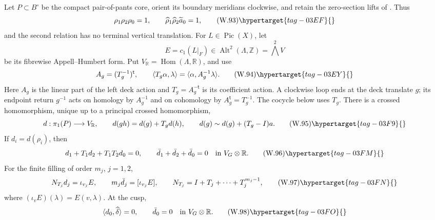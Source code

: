 \begin{proposition}
\hypertarget{tag-03IH}{}\label{wbII:prop:analytic-ah-boundary}

Let \(P\subset B^\circ\) be the compact pair-of-pants core,
orient its boundary meridians clockwise, and retain the zero-section lifts
of .  Thus
\[
 \rho_1\rho_2\rho_0=1,
 \qquad
 \widehat\rho_1\widehat\rho_2\widetilde a_0=1,
\tag{W.93}\hypertarget{tag-03EF}{}\label{wbII:eq:W:5.17-A1}
\]
and the second relation has no terminal vertical translation.  For
\(L\in\operatorname{Pic}(X)\), let
\[
 E=c_1(L|_F)\in\operatorname{Alt}^2(\Lambda,\mathbb Z)
   =\bigwedge^2V
\]
be its fibrewise Appell--Humbert form.  Put
\(V_{\mathbb R}=\operatorname{Hom}(\Lambda,\mathbb R)\), and use
\[
 A_g=(T_g^{-1})^{\mathsf t},
 \qquad
 \langle T_g\alpha,\lambda\rangle
 =\langle\alpha,A_g^{-1}\lambda\rangle.
\tag{W.94}\hypertarget{tag-03EY}{}\label{wbII:eq:W:5.17-A2}
\]
Here $A_g$ is the linear part of the left deck action and $T_g=A_g^{-\mathsf t}$
is its coefficient action.  A clockwise loop ends at the deck translate $g$;
its endpoint return $g^{-1}$ acts on homology by $A_g^{-1}$ and on
cohomology by $A_g^{\mathsf t}=T_g^{-1}$.  The cocycle below uses $T_g$.
There is a crossed homomorphism, unique up to a principal crossed
homomorphism,
\[
 d:\pi_1(P)\longrightarrow V_{\mathbb R},
 \qquad
 d(gh)=d(g)+T_gd(h),
 \qquad
 d(g)\sim d(g)+(T_g-I)a.
\tag{W.95}\hypertarget{tag-03F9}{}\label{wbII:eq:W:5.17-A3}
\]
If \(d_i=d(\rho_i)\), then
\[
 d_1+T_1d_2+T_1T_2d_0=0,
 \qquad
 \bar d_1+\bar d_2+\bar d_0=0
 \quad\text{in }V_G\otimes\mathbb R.
\tag{W.96}\hypertarget{tag-03FM}{}\label{wbII:eq:W:5.17-A4}
\]
For the finite filling of order \(m_j\), \(j=1,2\),
\[
 N_{T_j}d_j=\iota_{v_j}E,
 \qquad
 m_j\bar d_j=[\iota_{v_j}E],
 \qquad
 N_{T_j}=I+T_j+\cdots+T_j^{m_j-1},
\tag{W.97}\hypertarget{tag-03FN}{}\label{wbII:eq:W:5.17-A5}
\]
where \((\iota_vE)(\lambda)=E(v,\lambda)\).  At the cusp,
\[
 \langle d_0,\widehat\delta\rangle=0,
 \qquad
 \bar d_0=0\quad\text{in }V_G\otimes\mathbb R.
\tag{W.98}\hypertarget{tag-03FO}{}\label{wbII:eq:W:5.17-A6}
\]
\end{proposition}



